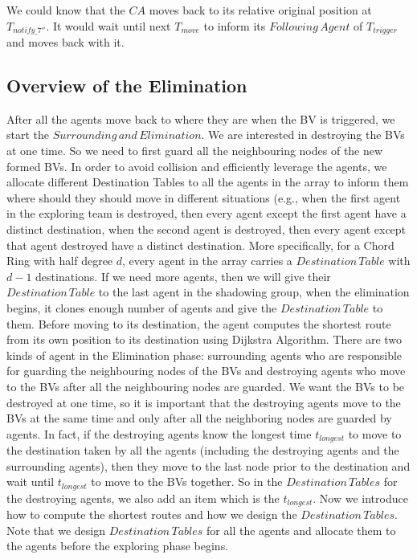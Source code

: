 We could know that the $CA$ moves back to its relative original position at $T_{notify\_7''}$. It would wait until next $T_{move}$ to inform its $Following\,Agent$ of $T_{trigger}$ and moves back with it.

\subsection{Overview of the Elimination}
After all the agents move back to where they are when the BV is triggered, we start the $Surrounding\,and\,Elimination$. We are interested in destroying the BVs at one time. So we need to first guard all the neighbouring nodes of the new formed BVs. In order to avoid collision and efficiently leverage the agents, we allocate different Destination Tables to all the agents in the array to inform them where should they should move in different situations (e.g., when the first agent in the exploring team is destroyed, then every agent except the first agent have a distinct destination, when the second agent is destroyed, then every agent except that agent destroyed have a distinct destination. More specifically, for a Chord Ring with half degree $d$, every agent in the array carries a $Destination\,Table$ with $d-1$ destinations. If we need more agents, then we will give their $Destination\,Table$ to the last agent in the shadowing group, when the elimination begins, it clones enough number of agents and give the $Destination\, Table$ to them. Before moving to its destination, the agent computes the shortest route from its own position to its destination using Dijkstra Algorithm. There are two kinds of agent in the Elimination phase: surrounding agents who are responsible for guarding the neighbouring nodes of the BVs and destroying agents who move to the BVs after all the neighbouring nodes are guarded. We want the BVs to be destroyed at one time, so it is important that the destroying agents move to the BVs at the same time and only after all the neighboring nodes are guarded by agents. In fact, if the destroying agents know the longest time $t_{longest}$ to move to the destination taken by all the agents (including the destroying agents and the surrounding agents), then they move to the last node prior to the destination and wait until $t_{longest}$ to move to the BVs together. So in the $Destination\,Tables$ for the destroying agents, we also add an item which is the $t_{longest}$. Now we introduce how to compute the shortest routes and how we design the $Destination\,Tables$. Note that we design $Destination\,Tables$ for all the agents and allocate them to the agents before the exploring phase begins.

